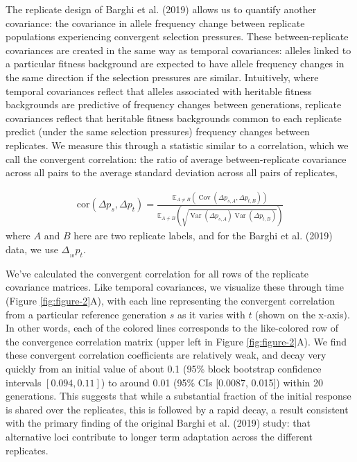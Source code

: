 \documentclass[9pt,twocolumn,twoside]{pnas-new}
\newcommand{\E}{\mathbb{E}}
\DeclareMathOperator{\var}{Var}
\DeclareMathOperator{\cov}{Cov}
\begin{document}
The replicate design of Barghi et al. (2019) allows us to quantify another
covariance: the covariance in allele frequency change between replicate
populations experiencing convergent selection pressures. These
between-replicate covariances are created in the same way as temporal
covariances: alleles linked to a particular fitness background are
expected to have allele frequency changes in the same direction if the
selection pressures are similar. Intuitively, where temporal covariances
reflect that alleles associated with heritable fitness backgrounds are
predictive of frequency changes between generations, replicate covariances
reflect that heritable fitness backgrounds common to each replicate predict
(under the same selection pressures) frequency changes between replicates. We
measure this through a statistic similar to a correlation, which we call the
convergent correlation: the ratio of average between-replicate covariance
across all pairs to the average standard deviation across all pairs of
replicates, 


\begin{align}
  \label{eq:conv-corr}
  \mathrm{cor}(\Delta p_s, \Delta p_t) = \frac{\E_{A\ne B} \left( \cov(\Delta p_{s,A}, \Delta p_{t,B}) \right)}{\E_{A\ne B} \left( \sqrt{\var(\Delta p_{s,A}) \var(\Delta p_{t,B})} \right)}
\end{align}
%
where $A$ and $B$ here are two replicate labels, and for the
Barghi et al. (2019) data, we use $\Delta_{_{10}} p_t$. 

We've calculated the convergent correlation for all rows of the replicate
covariance matrices. Like temporal covariances, we visualize these through time
(Figure \ref{fig:figure-2}A), with each line representing the convergent
correlation from a particular reference generation $s$ as it varies with $t$
(shown on the x-axis). In other words, each of the colored lines corresponds to
the like-colored row of the convergence correlation matrix (upper left in
Figure \ref{fig:figure-2}A). We find these convergent correlation coefficients
are relatively weak, and decay very quickly from an initial value of about 0.1
(95\% block bootstrap confidence intervals $[0.094, 0.11]$) to around 0.01
(95\% CIs [0.0087, 0.015]) within 20 generations. This suggests that while a
substantial fraction of the initial response is shared over the replicates,
this is followed by a rapid decay, a result consistent with the primary finding
of the original Barghi et al. (2019) study: that alternative loci
contribute to longer term adaptation across the different replicates. 
\end{document}
